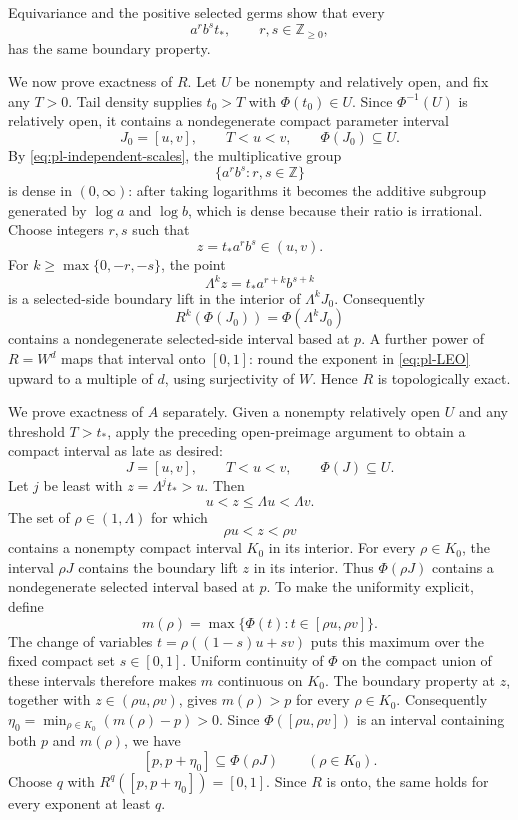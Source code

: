 \documentclass[11pt]{article}
\theoremstyle{definition}
\theoremstyle{remark}
\newcommand{\I}{[0,1]}
\begin{document}
Equivariance and the positive selected germs show that every
\begin{equation}\label{eq:pl-actor-boundaries}
 a^rb^s t_*,\qquad r,s\in\mathbb Z_{\geq0},
\end{equation}
has the same boundary property.

We now prove exactness of \(R\).  Let \(U\) be nonempty and relatively open,
and fix any \(T>0\).  Tail density supplies \(t_0>T\) with
\(\Phi(t_0)\in U\).  Since \(\Phi^{-1}(U)\) is relatively open, it contains a
nondegenerate compact parameter interval
\[
 J_0=[u,v],\qquad T<u<v,\qquad\Phi(J_0)\subseteq U.
\]
By \eqref{eq:pl-independent-scales}, the multiplicative group
\[
 \{a^rb^s:r,s\in\mathbb Z\}
\]
is dense in \((0,\infty)\): after taking logarithms it becomes the additive
subgroup generated by \(\log a\) and \(\log b\), which is dense because their
ratio is irrational.  Choose integers \(r,s\) such that
\[
 z=t_*a^rb^s\in(u,v).
\]
For \(k\geq\max\{0,-r,-s\}\), the point
\[
 \Lambda^kz=t_*a^{r+k}b^{s+k}
\]
is a selected-side boundary lift in the interior of \(\Lambda^kJ_0\).
Consequently
\[
 R^k(\Phi(J_0))=\Phi(\Lambda^kJ_0)
\]
contains a nondegenerate selected-side interval based at \(p\).  A further
power of \(R=W^d\) maps that interval onto \(\I\): round the exponent in
\eqref{eq:pl-LEO} upward to a multiple of \(d\), using surjectivity of
\(W\).  Hence \(R\) is topologically exact.

We prove exactness of \(A\) separately.  Given a nonempty relatively open
\(U\) and any threshold \(T>t_*\), apply the preceding open-preimage argument
to obtain a compact interval as late as desired:
\[
 J=[u,v],\qquad T<u<v,\qquad\Phi(J)\subseteq U.
\]
Let \(j\) be least with \(z=\Lambda^jt_*>u\).  Then
\[
 u<z\leq\Lambda u<\Lambda v.
\]
The set of \(\rho\in(1,\Lambda)\) for which
\[
 \rho u<z<\rho v
\]
contains a nonempty compact interval \(K_0\) in its interior.  For every
\(\rho\in K_0\), the interval \(\rho J\) contains the boundary lift \(z\)
in its interior.  Thus \(\Phi(\rho J)\) contains a nondegenerate selected
interval based at \(p\).  To make the uniformity explicit, define
\[
 m(\rho)=\max\{\Phi(t):t\in[\rho u,\rho v]\}.
\]
The change of variables \(t=\rho((1-s)u+sv)\) puts this maximum over the
fixed compact set \(s\in[0,1]\).  Uniform continuity of \(\Phi\) on the
compact union of these intervals therefore makes \(m\) continuous on
\(K_0\).  The boundary property at \(z\), together with
\(z\in(\rho u,\rho v)\), gives \(m(\rho)>p\) for every \(\rho\in K_0\).
Consequently
\(\eta_0=\min_{\rho\in K_0}(m(\rho)-p)>0\).  Since
\(\Phi([\rho u,\rho v])\) is an interval containing both \(p\) and
\(m(\rho)\), we have
\begin{equation}\label{eq:pl-uniform-selected}
 [p,p+\eta_0]\subseteq\Phi(\rho J)
 \qquad(\rho\in K_0).
\end{equation}
Choose \(q\) with \(R^q([p,p+\eta_0])=\I\).  Since \(R\) is onto, the same
holds for every exponent at least \(q\).
\end{document}
